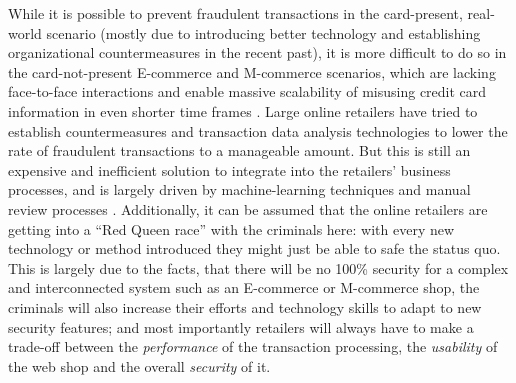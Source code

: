 While it is possible to prevent fraudulent transactions in the card-present, real-world scenario (mostly due to introducing better technology and establishing organizational countermeasures in the recent past), it is more difficult to do so in the card-not-present \gls{E-commerce} and \gls{M-commerce} scenarios, which are lacking face-to-face interactions and enable massive scalability of misusing credit card information in even shorter time frames \citep{Lewis2015}. Large online retailers have tried to establish countermeasures and transaction data analysis technologies to lower the rate of fraudulent transactions to a manageable amount. But this is still an expensive and inefficient solution to integrate into the retailers’ business processes, and is largely driven by machine-learning techniques and manual review processes \citep{Brachmann2015}. Additionally, it can be assumed that the online retailers are getting into a ``Red Queen race'' with the criminals here: with every new technology or method introduced they might just be able to safe the status quo. This is largely due to the facts, that there will be no 100\% security for a complex and interconnected system such as an \gls{E-commerce} or \gls{M-commerce} shop, the criminals will also increase their efforts and technology skills to adapt to new security features; and most importantly retailers will always have to make a trade-off between the \emph{performance} of the transaction processing, the \emph{usability} of the web shop and the overall \emph{security} of it.

